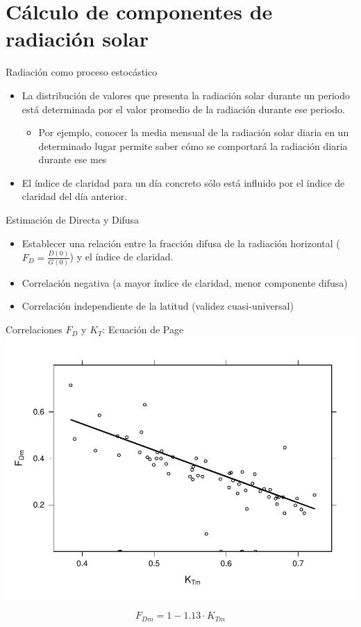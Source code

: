 \documentclass[xcolor={usenames,svgnames,dvipsnames}]{beamer}
\begin{document}
\section{Cálculo de componentes de radiación solar}
\label{sec-2}

\begin{frame}[label=sec-2-0-1]{Radiación como proceso estocástico}
\begin{itemize}
\item La \alert{distribución de valores} que presenta la radiación solar durante un periodo está \alert{determinada por el valor promedio de la radiación durante ese periodo}.

\begin{itemize}
\item Por ejemplo, conocer la media mensual de la radiación solar diaria en un determinado lugar permite saber cómo se comportará la radiación diaria durante ese mes
\end{itemize}

\item El índice de claridad para un día concreto \alert{sólo está influido} por el índice de claridad del \alert{día anterior}.
\end{itemize}
\end{frame}

\begin{frame}[label=sec-2-0-2]{Estimación de Directa y Difusa}
\begin{itemize}
\item Establecer una \alert{relación entre la fracción difusa} de la radiación horizontal ($F_{D}=\frac{D(0)}{G(0)}$) y \alert{el índice de claridad}.

\item \alert{Correlación negativa} (a mayor índice de claridad, menor componente difusa)

\item \alert{Correlación independiente de la latitud} (validez cuasi-universal)
\end{itemize}
\end{frame}

\begin{frame}[label=sec-2-0-3]{Correlaciones $F_{D}$ y $K_{T}$: Ecuación de Page}
\includegraphics[width=.9\linewidth]{../figs/FdKtMensual.pdf}

\[F_{Dm}=1-1.13\cdot K_{Tm}\]
\end{frame}
\end{document}
